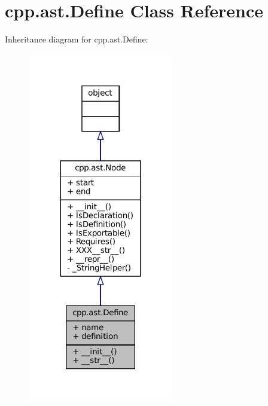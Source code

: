 \hypertarget{classcpp_1_1ast_1_1Define}{}\section{cpp.\+ast.\+Define Class Reference}
\label{classcpp_1_1ast_1_1Define}


Inheritance diagram for cpp.\+ast.\+Define\+:
\nopagebreak
\begin{figure}[H]
\begin{center}
\leavevmode
\includegraphics[width=180pt]{classcpp_1_1ast_1_1Define__inherit__graph}
\end{center}
\end{figure}


